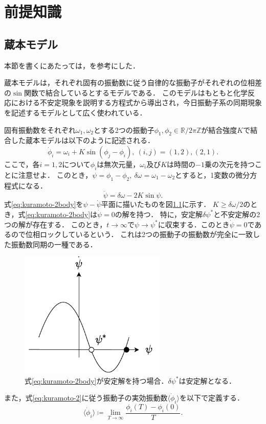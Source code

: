 \documentclass[../main]{subfiles}
\begin{document}
\chapter{前提知識}
\label{chap:prev}
\section{蔵本モデル}
本節を書くにあたっては，\cite{RODRIGUES20161,biorhythm}を参考にした．

蔵本モデルは，それぞれ固有の振動数に従う自律的な振動子がそれぞれの位相差の$\sin$関数で結合しているとするモデルである．
このモデルはもともと化学反応における不安定現象を説明する方程式から導出され\cite{kuramoto1975}，今日振動子系の同期現象を記述するモデルとして広く使われている．

固有振動数をそれぞれ$\omega_1,\omega_2$とする2つの振動子$\phi_1,\phi_2\in\mathbb{R}/2\pi\mathbb{Z}$が結合強度$K$で結合した蔵本モデルは以下のように記述される．
\begin{equation}
    \label{eq:kuramoto-2}
    \dot{\phi}_i=\omega_i+K\sin(\phi_j-\phi_i),\ (i,j)=(1,2),(2,1).
\end{equation}
ここで，各$i=1,2$について$\phi_i$は無次元量，$\omega_i$及び$K$は時間の$-1$乗の次元を持つことに注意せよ．
このとき，$\psi=\phi_1-\phi_2,\ \delta\omega=\omega_1-\omega_2$とすると，1変数の微分方程式になる．
\begin{equation}
    \label{eq:kuramoto-2body}
    \dot{\psi}=\delta\omega-2K\sin\psi.  
\end{equation}
式\eqref{eq:kuramoto-2body}を$\psi-\dot{\psi}$平面に描いたものを図\ref{fig:kuramoto-2}に示す．
$K\geq\delta\omega/2$のとき，式\eqref{eq:kuramoto-2body}は$\dot{\psi}=0$の解を持つ．
特に，安定解$\delta\psi^\ast$と不安定解の2つの解が存在する．
このとき，$t\to\infty$で$\psi\to\psi^\ast$に収束する．このとき$\dot{\psi}=0$であるので位相ロックしているという．
これは2つの振動子の振動数が完全に一致した振動数同期の一種である．
\begin{figure}[tbp]
\centering
\includegraphics[width=70mm]{images/kuramoto-2.pdf}
\centering
\caption{式\eqref{eq:kuramoto-2body}が安定解を持つ場合．$\delta\psi^\ast$は安定解となる．}
\label{fig:kuramoto-2}
\end{figure}
また，式\eqref{eq:kuramoto-2}に従う振動子の実効振動数$\langle\dot{\phi}_i\rangle$を以下で定義する．
\begin{equation}
    \langle\dot{\phi}_i\rangle\coloneqq\lim_{T\to\infty}\frac{\phi_i(T)-\phi_i(0)}{T}.
\end{equation}
\end{document}
